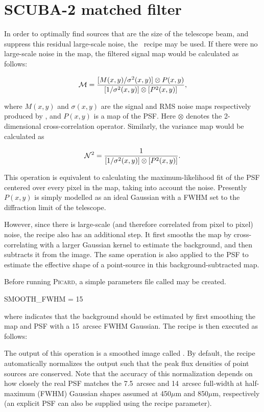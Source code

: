 \documentclass[11pt,oneside,chapters]{starlink}
\begin{document}
\newpage
\chapter{SCUBA-2 matched filter}
\label{app:mf}

In order to optimally find sources that are the size of the telescope
beam, and suppress this residual large-scale noise, the \picard\
recipe  may be used. If there were
no large-scale noise in the map, the filtered signal map would be
calculated as follows:

\begin{equation}
  {\cal{M}} = \frac{[M(x,y)/\sigma^2(x,y)] \otimes P(x,y)}
  {[1/\sigma^2(x,y)] \otimes [P^2(x,y)]},
\end{equation}

where $M(x,y)$ and $\sigma(x,y)$ are the signal and RMS
noise maps respectively produced by \smurf, and $P(x,y)$ is a map of the
PSF. Here \(\otimes\) denotes the 2-dimensional cross-correlation
operator. Similarly, the variance map would be calculated as

\begin{equation}
  {\cal{N}}^2 = \frac{1}{[1/\sigma^2(x,y)] \otimes [P^2(x,y)]}.
\end{equation}

This operation is equivalent to calculating the maximum-likelihood fit
of the PSF centered over every pixel in the map, taking into account
the noise. Presently $P(x,y)$ is simply modelled as an ideal Gaussian
with a FWHM set to the diffraction limit of the telescope.

However, since there is large-scale (and therefore correlated from
pixel to pixel) noise, the recipe also has an additional step. It
first smooths the map by cross-correlating with a larger Gaussian
kernel to estimate the background, and then subtracts it from the
image. The same operation is also applied to the PSF to estimate the
effective shape of a point-source in this background-subtracted map.

Before running \textsc{Picard}, a simple parameters file called 
may be created.
\begin{terminalv}
SMOOTH_FWHM = 15
\end{terminalv}
%
where  indicates that the background should
be estimated by first smoothing the map and PSF with a 15~arcsec FWHM
Gaussian. The recipe is then executed as follows:
%
\begin{terminalv}
\end{terminalv}
%
The output of this operation is a smoothed image called
. By default, the recipe automatically normalizes
the output such that the peak flux densities of point sources are
conserved. Note that the accuracy of this normalization depends on how
closely the real PSF matches the 7.5~arcsec and 14~arcsec full-width
at half-maximum (FWHM) Gaussian shapes assumed at 450$\mu$m and
850$\mu$m, respectively (an explicit PSF can also be supplied using
the \param{PSF\_MATCHFILTER} recipe parameter).
\end{document}
